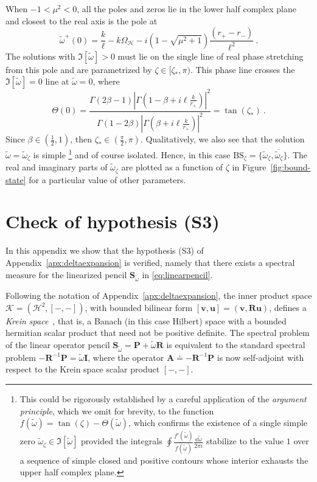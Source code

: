 \documentclass[aps, prd, amsmath, floats, floatfix, twocolumn, nofootinbib, superscriptaddress, showpacs]{revtex4-1}
\def\H{\mathcal{H}}
\def\A{\mathbf{A}}
\def\P{\mathbf{P}}
\def\R{\mathbf{R}}
\def\bS{\mathbf{S}}
\def\cK{\mathcal{K}}
\def\BS{\mathrm{BS}}
\def\tomega{{\tilde{\omega}}}
\begin{document}
When $-1 < \mu^2 < 0$, all the poles and zeros lie in the lower half complex plane and closest to the
real axis is the pole at
\[
\tomega^+(0)
= \frac{k}{\ell} - k \Omega_\H
-i\left(1-\sqrt{\mu^2+1}\right) \frac{(r_+-r_-)}{\ell^2} \ .
\]
The solutions with $\Im[\tomega] > 0$ must lie on the single line
of real phase stretching from this pole and are
parametrized by $\zeta \in [\zeta_*,\pi)$. This phase line crosses the
$\Im[\tomega] = 0$ line at $\tomega = 0$, where
\begin{equation*}
\Theta(0)
= \frac{\Gamma\left(2\beta-1\right)\left|\Gamma\left(1-\beta+i\ell\frac{k}{r_+}\right)\right|^2}{\Gamma\left(1-2\beta\right)\left|\Gamma\left(\beta+i\ell\frac{k}{r_+}\right)\right|^2}
= \tan(\zeta_*) \ .
\end{equation*}
Since $\beta \in (\frac{1}{2},1)$, then 
$\zeta_* \in (\frac{\pi}{2}, \pi)$. Qualitatively, we also
see that the solution $\tomega = \tomega_\zeta$ is simple%
\footnote{This could be rigorously established by a careful
	application of the \emph{argument principle}, which we omit for
	brevity, to the function $f(\tomega) = \tan(\zeta) - \Theta(\tomega)$,
	which confirms the existence of a single simple zero $\tomega_\zeta \in
	\Im[\tomega]$ provided the integrals $\oint
	\frac{f'(\tomega)}{f(\tomega)} \frac{\dd \tomega}{2\pi i}$ stabilize
	to the value $1$ over a sequence of simple closed and positive
	contours whose interior exhausts the upper half complex plane.}
and of course isolated. Hence, in this case $\BS_\zeta = \{\tomega_\zeta ,
\overline{\tomega_\zeta} \}$. The real and imaginary parts of
$\tomega_\zeta$ are plotted as a function of $\zeta$ in
Figure~\ref{fig:bound-state} for a particular value of other parameters.



\section{Check of hypothesis (S3)}
\label{apx:S3}

In this appendix we show that the hypothesis (S3) of Appendix~\ref{apx:deltaexpansion}
is verified, namely that there exists a spectral measure for the linearized pencil $\bS_\tomega$ in \eqref{eq:linearpencil}.

Following the notation of Appendix~\ref{apx:deltaexpansion}, the inner product
space $\cK = (\H^2, [-,-])$, with bounded bilinear form $[\textbf{v},
\textbf{u}] = (\textbf{v}, \R \textbf{u})$, defines a \emph{Krein
	space}~\cite{bognar,Langer:1982}, that is, a Banach (in this case
Hilbert) space with a bounded hermitian scalar product that need not be
positive definite. The spectral problem of the linear operator pencil
$\bS_\tomega = \P + \tomega \R$ is equivalent to the standard spectral
problem $-\R^{-1} \P = \tomega \mathbf{I}$, where the operator $\A
\doteq -\R^{-1} \P$ is now self-adjoint with respect to the Krein space
scalar product $[-,-]$.
\end{document}
